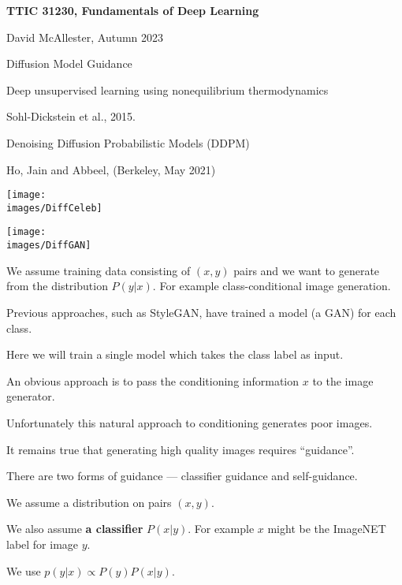 





{\Huge

  \centerline{\bf TTIC 31230, Fundamentals of Deep Learning}
  \bigskip
  \centerline{David McAllester, Autumn 2023}
  \vfill
  \vfil
  \centerline{Diffusion Model Guidance}
  \vfill
  \vfill


\centerline{Deep unsupervised learning using nonequilibrium thermodynamics}
\centerline{Sohl-Dickstein et al., 2015.}

\vfill
\centerline{Denoising Diffusion Probabilistic Models (DDPM)}
\centerline{Ho, Jain and Abbeel, (Berkeley, May 2021)}


\vfill
\centerline{\texttt{[image: \\images/DiffCeleb]}}


\vfill
\centerline{\texttt{[image: \\images/DiffGAN]}}


We assume training data consisting of $(x,y)$ pairs and we want to generate from the distribution $P(y|x)$.  For example class-conditional image generation.

\vfill
Previous approaches, such as StyleGAN, have trained a model (a GAN) for each class.

\vfill
Here we will train a single model which takes the class label as input.


An obvious approach is to pass the conditioning information $x$ to the image generator.

\vfill
Unfortunately this natural approach to conditioning generates poor images.

\vfill
It remains true that generating high quality images requires ``guidance''.

\vfill
There are two forms of guidance --- classifier guidance and self-guidance.

We assume a distribution on pairs $(x,y)$.

\vfill
We also assume {\bf a classifier} $P(x|y)$.  For example $x$ might be the ImageNET label for image $y$.

\vfill
We use $p(y|x) \propto P(y)P(x|y)$.

}
